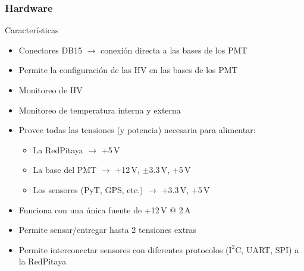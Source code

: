 \documentclass{beamer}
\begin{document}
\begin{frame}
\begin{columns}
\begin{column}{0.5\textwidth}
								\end{column}
				\end{columns}
\end{frame}

\begin{frame}
				\frametitle{Hardware}
				\begin{exampleblock}{Características}
								\begin{itemize}
												\item Conectores DB15 $\to$ conexión directa a las bases de los PMT
												\item Permite la configuración de las HV en las bases de los PMT
												\item Monitoreo de HV
												\item Monitoreo de temperatura \alert{interna y externa}
												\item Provee todas las tensiones (y potencia) necesaria para alimentar:
																\begin{itemize}
																				\item La RedPitaya $\to$ \alert{+5\,V}
																				\item La base del PMT $\to$ \alert{+12\,V, $\pm$3.3\,V,
																								+5\,V}
																				\item Los sensores (PyT, GPS, etc.) $\to$
																								\alert{+3.3\,V, +5\,V}
																\end{itemize}
												\item Funciona con una única fuente de +12\,V @ 2\,A
												\item Permite sensar/entregar hasta 2 tensiones extras
												\item Permite interconectar sensores con diferentes
																protocolos ($\text{I}^2$C,
																UART, SPI) a la RedPitaya
								\end{itemize}
				\end{exampleblock}
\end{frame}
\end{document}
